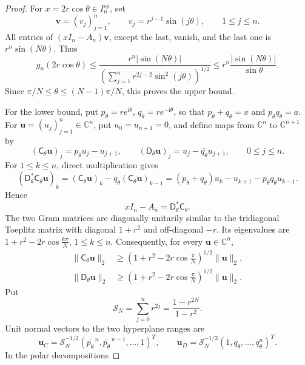 \documentclass[review,hidelinks,onefignum,onetabnum]{siamart251216}
\newcommand{\C}{\mathbb C}
\newcommand{\ii}{\mathrm i}
\begin{document}
\begin{proof}
For \(x=2r\cos\theta\in I_n^{\mathrm{sp}}\), set
\[
 \boldsymbol v=(v_j)_{j=1}^n,\qquad
 v_j=r^{j-1}\sin(j\theta),\qquad1\leq j\leq n.
\]
All entries of \((xI_n-A_n)\boldsymbol v\), except the last, vanish, and
the last one
is \(r^n\sin(N\theta)\).  Thus
\[
 g_n(2r\cos\theta)
 \leq\frac{r^n|\sin(N\theta)|}
 {\left(\sum_{j=1}^nr^{2j-2}\sin^2(j\theta)\right)^{1/2}}
 \leq r^n\frac{|\sin(N\theta)|}{\sin\theta}.
\]
Since \(\pi/N\leq\theta\leq(N-1)\pi/N\), this proves the upper bound.

For the lower bound, put
\(p_\theta=re^{\ii\theta}\), \(q_\theta=re^{-\ii\theta}\), so that
\(p_\theta+q_\theta=x\) and \(p_\theta q_\theta=a\).  For
\(\boldsymbol u=(u_j)_{j=1}^n\in\C^n\), put \(u_0=u_{n+1}=0\), and
define maps from \(\C^n\) to \(\C^{n+1}\) by
\[
 (\mathsf{C}_\theta\boldsymbol u)_j=p_\theta u_j-u_{j+1},\qquad
 (\mathsf{D}_\theta\boldsymbol u)_j=u_j-\overline{q_\theta}u_{j+1},
 \qquad0\leq j\leq n.
\]
For \(1\leq k\leq n\), direct multiplication gives
\[
 (\mathsf{D}_\theta^*\mathsf{C}_\theta\boldsymbol u)_k
 =(\mathsf{C}_\theta\boldsymbol u)_k
 -q_\theta(\mathsf{C}_\theta\boldsymbol u)_{k-1}
 =(p_\theta+q_\theta)u_k-u_{k+1}-p_\theta q_\theta u_{k-1}.
\]
Hence
\begin{equation}\label{eq:rectangular-factorization}
 xI_n-A_n=\mathsf{D}_\theta^*\mathsf{C}_\theta.
\end{equation}
The two Gram matrices are
diagonally unitarily similar to the tridiagonal Toeplitz matrix with
diagonal \(1+r^2\) and off-diagonal \(-r\).  Its eigenvalues are
\(1+r^2-2r\cos\frac{k\pi}{N}\), \(1\leq k\leq n\).  Consequently, for
every \(\boldsymbol u\in\C^n\),
\begin{equation}\label{eq:rectangular-min}
 \begin{aligned}
  \lVert\mathsf C_\theta\boldsymbol u\rVert_2
  &\geq \left(1+r^2-2r\cos\frac{\pi}{N}\right)^{1/2}
    \lVert\boldsymbol u\rVert_2,\\
  \lVert\mathsf D_\theta\boldsymbol u\rVert_2
  &\geq \left(1+r^2-2r\cos\frac{\pi}{N}\right)^{1/2}
    \lVert\boldsymbol u\rVert_2.
 \end{aligned}
\end{equation}
Put
\[
 \mathcal S_N=\sum_{j=0}^nr^{2j}=\frac{1-r^{2N}}{1-r^2}.
\]
Unit normal vectors to the two hyperplane ranges are
\[
 \boldsymbol u_C=\mathcal S_N^{-1/2}
 (\overline{p_\theta}^{\,n},\overline{p_\theta}^{\,n-1},\ldots,1)^T,
 \qquad
 \boldsymbol u_D=\mathcal S_N^{-1/2}(1,q_\theta,\ldots,q_\theta^n)^T.
\]
In the polar decompositions

\end{proof}
\end{document}
